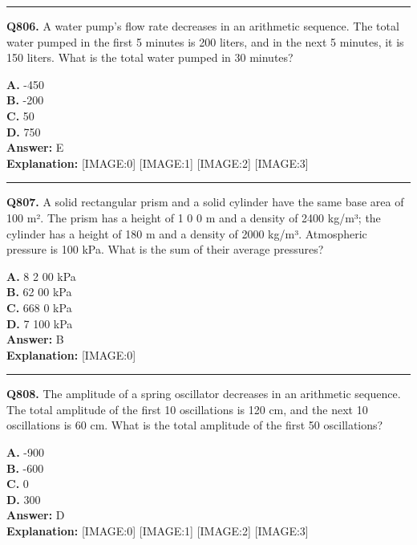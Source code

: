 \documentclass[12pt]{article}
\begin{document}
\hrule
\vspace{1em}


\noindent
\textbf{Q806.} A water pump's flow rate decreases in an arithmetic sequence. The total water pumped in the first 5 minutes is 200 liters, and in the next 5 minutes, it is 150 liters. What is the total water pumped in 30 minutes?



\textbf{A.} -450 \\
\textbf{B.} -200 \\
\textbf{C.} 50 \\
\textbf{D.} 750 \\

\textbf{Answer:} E \\
\textbf{Explanation:} [IMAGE:0]
[IMAGE:1]
[IMAGE:2]
[IMAGE:3]

\hrule
\vspace{1em}


\noindent
\textbf{Q807.} A solid rectangular prism and a solid cylinder have the same base area of 100 m². The prism has a height of 1
0
0 m and a density of 2400 kg/m³; the cylinder has a height of 180 m and a density of 2000 kg/m³. Atmospheric pressure is 100 kPa. What is the sum of their average pressures?



\textbf{A.} 8
2
00 kPa \\
\textbf{B.} 62
00 kPa \\
\textbf{C.} 668
0 kPa \\
\textbf{D.} 7
100 kPa \\

\textbf{Answer:} B \\
\textbf{Explanation:} [IMAGE:0]

\hrule
\vspace{1em}


\noindent
\textbf{Q808.} The amplitude of a spring oscillator decreases in an arithmetic sequence. The total amplitude of the first 10 oscillations is 120 cm, and the next 10 oscillations is 60 cm. What is the total amplitude of the first 50 oscillations?



\textbf{A.} -900 \\
\textbf{B.} -600 \\
\textbf{C.} 0 \\
\textbf{D.} 300 \\

\textbf{Answer:} D \\
\textbf{Explanation:} [IMAGE:0]
[IMAGE:1]
[IMAGE:2]
[IMAGE:3]
\end{document}

